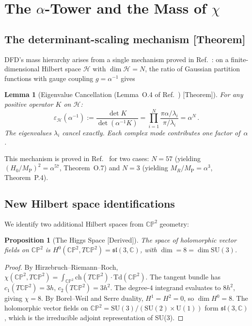 \documentclass[aps,prd,twocolumn,superscriptaddress,showpacs,floatfix,nofootinbib]{revtex4-2}
\newtheorem{lemma}[theorem]{Lemma}
\newtheorem{proposition}[theorem]{Proposition}
\theoremstyle{definition}
\theoremstyle{remark}
\newcommand{\CP}{\mathbb{CP}}
\newcommand{\MP}{M_{\mathrm{P}}}
\newcommand{\grade}[1]{\textsf{\footnotesize [#1]}}
\begin{document}
\section{The $\alpha$-Tower and the Mass of $\chi$}
\label{sec:tower}

\subsection{The determinant-scaling mechanism \grade{Theorem}}

DFD's mass hierarchy arises from a single mechanism proved
in Ref.~\cite{Alcock2025}: on a finite-dimensional Hilbert
space $\mathcal{H}$ with $\dim\mathcal{H}=N$, the ratio of
Gaussian partition functions with gauge coupling
$g=\alpha^{-1}$ gives

\begin{lemma}[Eigenvalue Cancellation
(Lemma~O.4 of Ref.~\cite{Alcock2025}) \grade{Theorem}]
\label{lem:eigenvalue}
For any positive operator $K$ on $\mathcal{H}$:
\begin{equation}
\label{eq:det-scaling}
\varepsilon_{\mathcal{H}}(\alpha^{-1})
:= \frac{\det K}{\det(\alpha^{-1}K)}
= \prod_{i=1}^N \frac{\pi\alpha/\lambda_i}{\pi/\lambda_i}
= \alpha^N\,.
\end{equation}
The eigenvalues $\lambda_i$ cancel exactly. Each complex
mode contributes one factor of~$\alpha$.
\end{lemma}

This mechanism is proved in Ref.~\cite{Alcock2025} for
two cases: $N=57$ (yielding
$(H_0/\MP)^2=\alpha^{57}$, Theorem~O.7) and $N=3$
(yielding $M_R/\MP=\alpha^3$, Theorem~P.4).

\subsection{New Hilbert space identifications}

We identify two additional Hilbert spaces from $\CP^2$
geometry:

\begin{proposition}[The Higgs Space \grade{Derived}]
\label{prop:higgs}
The space of holomorphic vector fields on $\CP^2$ is
$H^0(\CP^2, T\CP^2) = \mathfrak{sl}(3,\mathbb{C})$, with
$\dim = 8 = \dim\mathrm{SU}(3)$.
\end{proposition}

\begin{proof}
By Hirzebruch--Riemann--Roch, $\chi(\CP^2,T\CP^2)
= \int_{\CP^2}\mathrm{ch}(T\CP^2)\cdot\mathrm{Td}(\CP^2)$.
The tangent bundle has $c_1(T\CP^2)=3h$, $c_2(T\CP^2)=3h^2$.
The degree-$4$ integrand evaluates to $8h^2$, giving
$\chi=8$. By Borel--Weil and Serre duality,
$H^1=H^2=0$, so $\dim H^0 = 8$.
The holomorphic vector fields on
$\CP^2=\mathrm{SU}(3)/(\mathrm{SU}(2){\times}\mathrm{U}(1))$
form $\mathfrak{sl}(3,\mathbb{C})$, which is the irreducible
adjoint representation of SU(3).
\end{proof}
\end{document}
